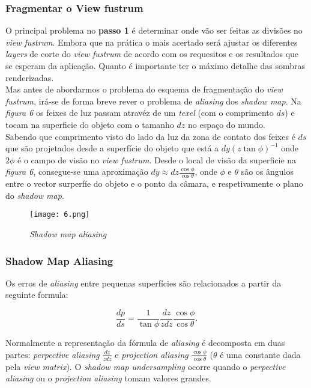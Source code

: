 \documentclass[12pt]{article}
\begin{document}
\subsubsection{Fragmentar o View fustrum}

\vspace{7 mm}
\hspace{7 mm}O principal problema no \textbf{passo 1} é determinar onde vão ser feitas as divisões no {\it view fustrum}. Embora que na prática o mais acertado será ajustar os diferentes {\it layers} de corte do {\it view fustrum} de acordo com os requesitos e os resultados que se esperam da aplicação. Quanto é importante ter o máximo detalhe das sombras renderizadas.\\

Mas antes de abordarmos o problema do esquema de fragmentação do {\it view fustrum}, irá-se de forma breve rever o problema de {\it aliasing} dos {\it shadow map}. Na {\it figura 6} os feixes de luz passam atravéz  de um {\it texel} (com o comprimento $ds$) e tocam na superficie do objeto com o tamanho $dz$ no espaço do mundo. \\

Sabendo que comprimento visto do lado da luz da zona de contato dos feixes é $ds$ que são projetados desde a superfície do objeto que está a $dy(z \tan \phi)^{-1}$ onde $2\phi$ é o campo de visão no {\it view fustrum}. Desde o local de visão da superficie na {\it figura 6}, consegue-se uma aproximação  $dy \approx dz \frac{\cos \phi}{\cos \theta} $,  onde $\phi$ e $\theta$ são os ângulos entre o vector surperfíe do objeto e o ponto da câmara, e respetivamente o plano do {\it shadow map}.

\begin{figure}[!h]
\centering
\texttt{[image: 6.png]}
\caption{{\it Shadow map aliasing}}
\label{img6}
\end{figure}
\vspace{7 mm}

\subsubsection{Shadow Map Aliasing}

Os erros de {\it aliasing} entre pequenas superfícies são relacionados a partir da seguinte formula:

$$ \frac{dp}{ds} = \frac{1}{\tan \phi} \frac{dz}{zdz} \frac{\cos \phi}{\cos \theta}.$$

Normalmente a representação da fórmula de {\it aliasing} é decomposta em duas partes: {\it perpective aliasing} $\frac{dz}{zdz}$ e {\it projection aliasing} $\frac{\cos \phi}{\cos \theta}$ ($\theta$ é uma constante dada pela {\it view matrix}). O {\it shadow map undersampling} ocorre quando o {\it perpective aliasing} ou o {\it projection aliasing} tomam valores grandes. \\
\end{document}
